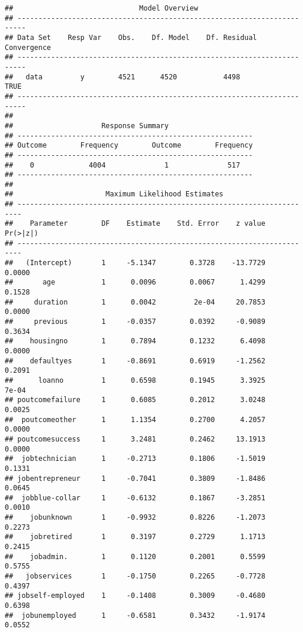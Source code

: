 \documentclass[
]{article}
\begin{document}
\begin{verbatim}
##                              Model Overview                              
## ------------------------------------------------------------------------
## Data Set    Resp Var    Obs.    Df. Model    Df. Residual    Convergence 
## ------------------------------------------------------------------------
##   data         y        4521      4520           4498           TRUE     
## ------------------------------------------------------------------------
## 
##                     Response Summary                     
## --------------------------------------------------------
## Outcome        Frequency        Outcome        Frequency 
## --------------------------------------------------------
##    0             4004              1              517    
## --------------------------------------------------------
## 
##                      Maximum Likelihood Estimates                       
## -----------------------------------------------------------------------
##    Parameter        DF    Estimate    Std. Error    z value     Pr(>|z|) 
## -----------------------------------------------------------------------
##   (Intercept)       1     -5.1347        0.3728    -13.7729      0.0000 
##       age           1      0.0096        0.0067      1.4299      0.1528 
##     duration        1      0.0042         2e-04     20.7853      0.0000 
##     previous        1     -0.0357        0.0392     -0.9089      0.3634 
##    housingno        1      0.7894        0.1232      6.4098      0.0000 
##    defaultyes       1     -0.8691        0.6919     -1.2562      0.2091 
##      loanno         1      0.6598        0.1945      3.3925       7e-04 
## poutcomefailure     1      0.6085        0.2012      3.0248      0.0025 
##  poutcomeother      1      1.1354        0.2700      4.2057      0.0000 
## poutcomesuccess     1      3.2481        0.2462     13.1913      0.0000 
##  jobtechnician      1     -0.2713        0.1806     -1.5019      0.1331 
## jobentrepreneur     1     -0.7041        0.3809     -1.8486      0.0645 
##  jobblue-collar     1     -0.6132        0.1867     -3.2851      0.0010 
##    jobunknown       1     -0.9932        0.8226     -1.2073      0.2273 
##    jobretired       1      0.3197        0.2729      1.1713      0.2415 
##    jobadmin.        1      0.1120        0.2001      0.5599      0.5755 
##   jobservices       1     -0.1750        0.2265     -0.7728      0.4397 
## jobself-employed    1     -0.1408        0.3009     -0.4680      0.6398 
##  jobunemployed      1     -0.6581        0.3432     -1.9174      0.0552 

\end{verbatim}
\end{document}
